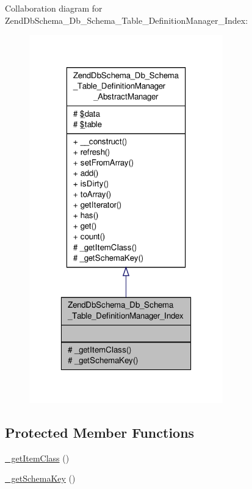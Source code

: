 Collaboration diagram for Zend\-Db\-Schema\-\_\-\-Db\-\_\-\-Schema\-\_\-\-Table\-\_\-\-Definition\-Manager\-\_\-\-Index\-:\nopagebreak
\begin{figure}[H]
\begin{center}
\leavevmode
\includegraphics[width=238pt]{classZendDbSchema__Db__Schema__Table__DefinitionManager__Index__coll__graph}
\end{center}
\end{figure}
\subsection*{Protected Member Functions}
\begin{DoxyCompactItemize}
\item 
\hyperlink{classZendDbSchema__Db__Schema__Table__DefinitionManager__Index_ad5850c548a2cac2de6baaf9667fb7ab0}{\-\_\-get\-Item\-Class} ()
\item 
\hyperlink{classZendDbSchema__Db__Schema__Table__DefinitionManager__Index_aa1ae8aecca2874fafa8792aeb8f2b9ba}{\-\_\-get\-Schema\-Key} ()
\end{DoxyCompactItemize}
